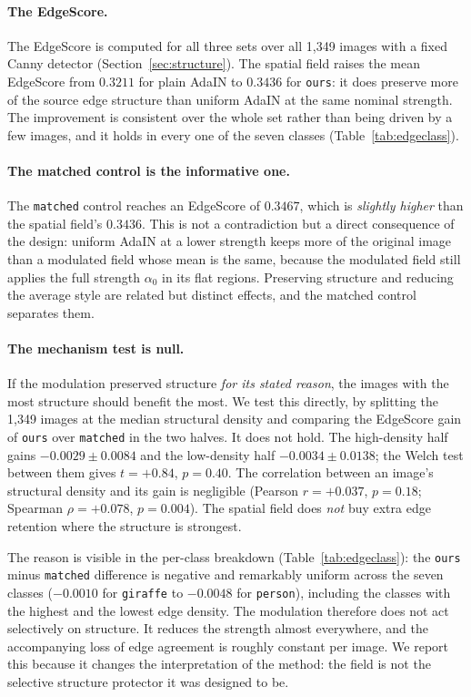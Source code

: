 \paragraph{The EdgeScore.}
The EdgeScore is computed for all three sets over all 1{,}349 images with a
fixed Canny detector (Section~\ref{sec:structure}). The spatial field raises
the mean EdgeScore from $0.3211$ for plain AdaIN to $0.3436$ for
\texttt{ours}: it does preserve more of the source edge structure than
uniform AdaIN at the same nominal strength. The improvement is consistent
over the whole set rather than being driven by a few images, and it holds
in every one of the seven classes (Table~\ref{tab:edgeclass}).

\paragraph{The matched control is the informative one.}
The \texttt{matched} control reaches an EdgeScore of $0.3467$, which is
\emph{slightly higher} than the spatial field's $0.3436$. This is not a
contradiction but a direct consequence of the design: uniform AdaIN at a
lower strength keeps more of the original image than a modulated field
whose mean is the same, because the modulated field still applies the full
strength $\alpha_0$ in its flat regions. Preserving structure and reducing
the average style are related but distinct effects, and the matched control
separates them.

\paragraph{The mechanism test is null.}
If the modulation preserved structure \emph{for its stated reason}, the
images with the most structure should benefit the most. We test this
directly, by splitting the 1{,}349 images at the median structural density
and comparing the EdgeScore gain of \texttt{ours} over \texttt{matched} in
the two halves. It does not hold. The high-density half gains
$-0.0029 \pm 0.0084$ and the low-density half $-0.0034 \pm 0.0138$; the
Welch test between them gives $t = +0.84$, $p = 0.40$. The correlation
between an image's structural density and its gain is negligible
(Pearson $r = +0.037$, $p = 0.18$; Spearman $\rho = +0.078$,
$p = 0.004$). The spatial field does \emph{not} buy extra edge retention
where the structure is strongest.

The reason is visible in the per-class breakdown
(Table~\ref{tab:edgeclass}): the \texttt{ours} minus \texttt{matched}
difference is negative and remarkably uniform across the seven classes
($-0.0010$ for \texttt{giraffe} to $-0.0048$ for \texttt{person}),
including the classes with the highest and the lowest edge density. The
modulation therefore does not act selectively on structure. It reduces the
strength almost everywhere, and the accompanying loss of edge agreement is
roughly constant per image. We report this because it changes the
interpretation of the method: the field is not the selective structure
protector it was designed to be.

